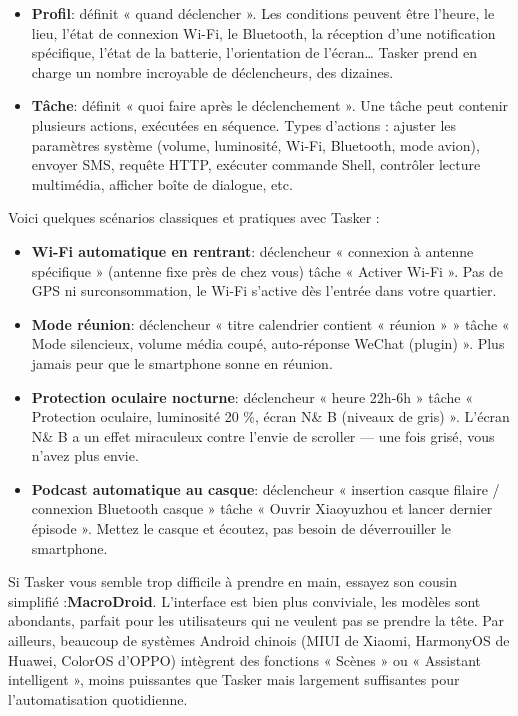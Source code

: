 \begin{itemize}
  \item \textbf{Profil}: définit « quand déclencher ». Les conditions peuvent être l’heure, le lieu, l’état de connexion Wi-Fi, le Bluetooth, la réception d’une notification spécifique, l’état de la batterie, l’orientation de l’écran… Tasker prend en charge un nombre incroyable de déclencheurs, des dizaines.
  \item \textbf{Tâche}: définit « quoi faire après le déclenchement ». Une tâche peut contenir plusieurs actions, exécutées en séquence. Types d’actions : ajuster les paramètres système (volume, luminosité, Wi-Fi, Bluetooth, mode avion), envoyer SMS, requête HTTP, exécuter commande Shell, contrôler lecture multimédia, afficher boîte de dialogue, etc.
\end{itemize}

Voici quelques scénarios classiques et pratiques avec Tasker :

\begin{itemize}
  \item \textbf{Wi-Fi automatique en rentrant}: déclencheur « connexion à antenne spécifique » (antenne fixe près de chez vous) tâche « Activer Wi-Fi ». Pas de GPS ni surconsommation, le Wi-Fi s’active dès l’entrée dans votre quartier.
  \item \textbf{Mode réunion}: déclencheur « titre calendrier contient « réunion » » tâche « Mode silencieux, volume média coupé, auto-réponse WeChat (plugin) ». Plus jamais peur que le smartphone sonne en réunion.
  \item \textbf{Protection oculaire nocturne}: déclencheur « heure 22h-6h » tâche « Protection oculaire, luminosité 20 \%, écran N\& B (niveaux de gris) ». L’écran N\& B a un effet miraculeux contre l’envie de scroller — une fois grisé, vous n’avez plus envie.
  \item \textbf{Podcast automatique au casque}: déclencheur « insertion casque filaire / connexion Bluetooth casque » tâche « Ouvrir Xiaoyuzhou et lancer dernier épisode ». Mettez le casque et écoutez, pas besoin de déverrouiller le smartphone.
\end{itemize}

Si Tasker vous semble trop difficile à prendre en main, essayez son cousin simplifié :\textbf{MacroDroid}. L’interface est bien plus conviviale, les modèles sont abondants, parfait pour les utilisateurs qui ne veulent pas se prendre la tête. Par ailleurs, beaucoup de systèmes Android chinois (MIUI de Xiaomi, HarmonyOS de Huawei, ColorOS d’OPPO) intègrent des fonctions « Scènes » ou « Assistant intelligent », moins puissantes que Tasker mais largement suffisantes pour l’automatisation quotidienne.

